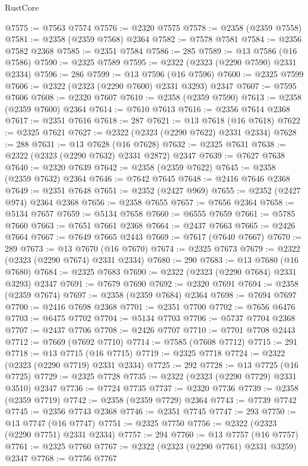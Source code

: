 \begin{lexlean}{RustCore}
\begin{coremodule}
@7575 := @7563 @7574
@7576 := @2320 @7575
@7578 := @2358 (@2359 @7558)
@7581 := @2358 (@2359 @7568) @2364
@7582 := @7578 @7581
@7584 := @2356 @7582 @2368
@7585 := @2351 @7584
@7586 := 285
@7589 := @13 @7586 (@16 @7586)
@7590 := @2325 @7589
@7595 := @2322 (@2323 (@2290 @7590) @2331 @2334)
@7596 := 286
@7599 := @13 @7596 (@16 @7596)
@7600 := @2325 @7599
@7606 := @2322 (@2323 (@2290 @7600) @2331 @3293) @2347
@7607 := @7595 @7606
@7608 := @2320 @7607
@7610 := @2358 (@2359 @7590)
@7613 := @2358 (@2359 @7600) @2364
@7614 := @7610 @7613
@7616 := @2356 @7614 @2368
@7617 := @2351 @7616
@7618 := 287
@7621 := @13 @7618 (@16 @7618)
@7622 := @2325 @7621
@7627 := @2322 (@2323 (@2290 @7622) @2331 @2334)
@7628 := 288
@7631 := @13 @7628 (@16 @7628)
@7632 := @2325 @7631
@7638 := @2322 (@2323 (@2290 @7632) @2331 @2872) @2347
@7639 := @7627 @7638
@7640 := @2320 @7639
@7642 := @2358 (@2359 @7622)
@7645 := @2358 (@2359 @7632) @2364
@7646 := @7642 @7645
@7648 := @2416 @7646 @2368
@7649 := @2351 @7648
@7651 := @2352 (@2427 @969)
@7655 := @2352 (@2427 @974) @2364 @2368
@7656 := @2358 @7655
@7657 := @7656 @2364
@7658 := @5134 @7657
@7659 := @5134 @7658
@7660 := @6555 @7659
@7661 := @5785 @7660
@7663 := @7651 @7661 @2368
@7664 := @2437 @7663
@7665 := @2426 @7664
@7667 := @7649 @7665 @2443
@7669 := @7617 (@7640 @7667)
@7670 := 289
@7673 := @13 @7670 (@16 @7670)
@7674 := @2325 @7673
@7679 := @2322 (@2323 (@2290 @7674) @2331 @2334)
@7680 := 290
@7683 := @13 @7680 (@16 @7680)
@7684 := @2325 @7683
@7690 := @2322 (@2323 (@2290 @7684) @2331 @3293) @2347
@7691 := @7679 @7690
@7692 := @2320 @7691
@7694 := @2358 (@2359 @7674)
@7697 := @2358 (@2359 @7684) @2364
@7698 := @7694 @7697
@7700 := @2416 @7698 @2368
@7701 := @2351 @7700
@7702 := @7656 @6476
@7703 := @6475 @7702
@7704 := @5134 @7703
@7706 := @5737 @7704 @2368
@7707 := @2437 @7706
@7708 := @2426 @7707
@7710 := @7701 @7708 @2443
@7712 := @7669 (@7692 @7710)
@7714 := @7585 (@7608 @7712)
@7715 := 291
@7718 := @13 @7715 (@16 @7715)
@7719 := @2325 @7718
@7724 := @2322 (@2323 (@2290 @7719) @2331 @2334)
@7725 := 292
@7728 := @13 @7725 (@16 @7725)
@7729 := @2325 @7728
@7735 := @2322 (@2323 (@2290 @7729) @2331 @3510) @2347
@7736 := @7724 @7735
@7737 := @2320 @7736
@7739 := @2358 (@2359 @7719)
@7742 := @2358 (@2359 @7729) @2364
@7743 := @7739 @7742
@7745 := @2356 @7743 @2368
@7746 := @2351 @7745
@7747 := 293
@7750 := @13 @7747 (@16 @7747)
@7751 := @2325 @7750
@7756 := @2322 (@2323 (@2290 @7751) @2331 @2334)
@7757 := 294
@7760 := @13 @7757 (@16 @7757)
@7761 := @2325 @7760
@7767 := @2322 (@2323 (@2290 @7761) @2331 @3259) @2347
@7768 := @7756 @7767

\end{coremodule}
\end{lexlean}
